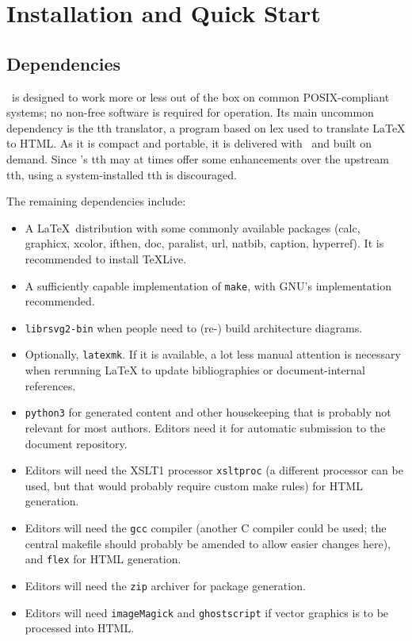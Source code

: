 \documentclass[11pt,a4paper]{ivoa}
\begin{document}
\section{Installation and Quick Start}
\label{sect:quick}

\subsection{Dependencies}

\ivoatex\ is designed to work more or less out of the box on common
POSIX-compliant systems; no non-free software is required for operation.
Its main uncommon dependency is the tth translator,
a program based on lex used to translate LaTeX
to HTML.  As it is compact and portable, it is delivered with
\ivoatex~and built on demand.
Since \ivoatex's tth may at times offer
some enhancements over the upstream tth, using a system-installed tth is
discouraged.

The remaining dependencies include:

\begin{itemize}
\item A \LaTeX\ distribution with some commonly available packages (calc,
graphicx, xcolor, ifthen, doc, paralist, url, natbib, caption,
hyperref).
It is recommended to install TeXLive.
\item A sufficiently capable implementation of \texttt{make}, with GNU's
implementation recommended.
\item \texttt{librsvg2-bin} when people need to (re-) build architecture
diagrams.
\item Optionally, \texttt{latexmk}.  If it is available, a lot less
manual attention is necessary when rerunning LaTeX to update
bibliographies or document-internal references.
\item \texttt{python3} for  generated content and other housekeeping
that is probably not relevant for most authors.  Editors need it for
automatic submission to the document repository.
\item Editors will need the XSLT1 processor
\texttt{xsltproc} (a different processor can
be used, but that would probably require custom make rules) for HTML
generation.
\item Editors will need the
\texttt{gcc} compiler (another C compiler could be used; the
central makefile should probably be amended to allow easier changes
here), and \texttt{flex} for HTML generation.
\item Editors will need the \texttt{zip} archiver for package generation.
\item Editors will need \texttt{imageMagick} and \texttt{ghostscript} if
vector graphics is to be processed into HTML.
\end{itemize}
\end{document}
